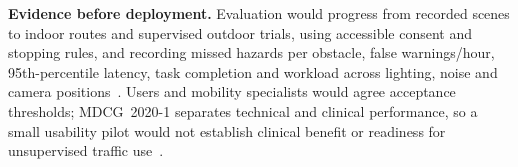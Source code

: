\documentclass[10pt,twoside,english,a4paper]{article}
\begin{document}
\textbf{Evidence before deployment.} Evaluation would progress from recorded scenes to indoor routes and supervised outdoor trials, using accessible consent and stopping rules, and recording missed hazards per obstacle, false warnings/hour, 95th-percentile latency, task completion and workload across lighting, noise and camera positions~\cite{mdcgclinical2020}. Users and mobility specialists would agree acceptance thresholds; MDCG~2020-1 separates technical and clinical performance, so a small usability pilot would not establish clinical benefit or readiness for unsupervised traffic use~\cite{mdcgclinical2020}.

\clearpage
{\fontsize{8.5}{10}\selectfont

}

\end{document}
